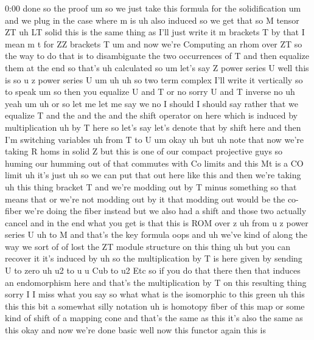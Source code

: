 \begin{unfinished}{0:00}
done  so  the
proof  um  so  we  just  take
this  formula  for  the
solidification  um  and  we  plug  in  the
case  where  m  is  uh  also  induced  so  we
get  that
so  M  tensor
ZT  uh  LT  solid  this  is  the  same  thing
as  I'll  just  write  it  m  brackets  T  by
that  I  mean  m  t  for  ZZ  brackets  T  um  and
now  we're  Computing  an  rhom  over  ZT  so
the  way  to  do  that  is  to  disambiguate
the  two  occurrences  of  T  and  then
equalize  them  at  the  end  so  that's  uh
calculated
so  um  let's  say  Z  power  series  U  well
this  is  so  u  z  power  series  U
um
uh
uh  so  two  term  complex  I'll  write  it
vertically  so  to  speak  um  so  then  you
equalize  U  and  T  or  no  sorry  U  and  T
inverse  no  uh
yeah
um
uh  or  so  let  me  let  me  say  we  no  I
should  I  should  say  rather  that  we
equalize  T  and  the  and  the  and  the  shift
operator  on  here  which  is  induced  by
multiplication  uh  by  T  here  so  let's
say  let's  denote  that  by  shift  here  and
then  I'm  switching  variables  uh  from  T
to
U
um
okay
uh
but  uh  note  that  now  we're  taking  R  homs
in  solid  Z  but  this  is  one  of  our
compact  projective  guys  so  huming  our
humming  out  of  that  commutes  with  Co
limits  and  this  Mt  is  a  CO  limit  uh  it's
just  uh  so  we  can  put  that  out  here  like
this  and  then  we're  taking  uh  this  thing
bracket  T  and  we're  modding  out  by  T
minus  something  so  that  means  that  or
we're  not  modding  out  by  it  that  modding
out  would  be  the  co-  fiber  we're  doing
the  fiber  instead  but  we  also  had  a
shift  and  those  two  actually  cancel  and
in  the  end  what  you  get  is  that  this  is
ROM  over
z  uh  from  u  z  power  series  U  uh  to
M  and  that's  the  key
formula
oops  and  uh  we've  kind  of  along  the  way
we  sort  of  of  lost  the  ZT  module
structure  on  this  thing  uh  but  you  can
recover  it  it's  induced  by  uh  so  the
multiplication  by  T  is  here  given  by
sending  U  to  zero  uh  u2  to  u  u  Cub  to
u2  Etc  so  if  you  do  that  there  then
that  induces  an  endomorphism  here  and
that's  the  multiplication  by  T  on  this
resulting
thing  sorry  I  I  miss  what  you  say  so
what  what  is  the  isomorphic  to  this
green  uh  this  this  this  bit  a  somewhat
silly  notation  uh  is  homotopy  fiber  of
this  map  or  some  kind  of  shift  of  a
mapping  cone  and  that's  the  same  as  this
it's  also  the  same  as
this  okay  and  now  we're  done  basic  well
now  this  functor  again  this  is

\end{unfinished}
